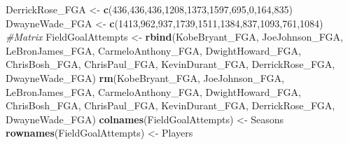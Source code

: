 \documentclass[
]{article}
\newenvironment{Shaded}{\begin{snugshade}}{\end{snugshade}}
\newcommand{\CommentTok}[1]{\textcolor[rgb]{0.56,0.35,0.01}{\textit{#1}}}
\newcommand{\DecValTok}[1]{\textcolor[rgb]{0.00,0.00,0.81}{#1}}
\newcommand{\KeywordTok}[1]{\textcolor[rgb]{0.13,0.29,0.53}{\textbf{#1}}}
\newcommand{\NormalTok}[1]{#1}
\newcommand{\StringTok}[1]{\textcolor[rgb]{0.31,0.60,0.02}{#1}}
\begin{document}
\begin{Shaded}
\begin{Highlighting}[]
\NormalTok{DerrickRose_FGA <-}\StringTok{ }\KeywordTok{c}\NormalTok{(}\DecValTok{436}\NormalTok{,}\DecValTok{436}\NormalTok{,}\DecValTok{436}\NormalTok{,}\DecValTok{1208}\NormalTok{,}\DecValTok{1373}\NormalTok{,}\DecValTok{1597}\NormalTok{,}\DecValTok{695}\NormalTok{,}\DecValTok{0}\NormalTok{,}\DecValTok{164}\NormalTok{,}\DecValTok{835}\NormalTok{)}
\NormalTok{DwayneWade_FGA <-}\StringTok{ }\KeywordTok{c}\NormalTok{(}\DecValTok{1413}\NormalTok{,}\DecValTok{962}\NormalTok{,}\DecValTok{937}\NormalTok{,}\DecValTok{1739}\NormalTok{,}\DecValTok{1511}\NormalTok{,}\DecValTok{1384}\NormalTok{,}\DecValTok{837}\NormalTok{,}\DecValTok{1093}\NormalTok{,}\DecValTok{761}\NormalTok{,}\DecValTok{1084}\NormalTok{)}
\CommentTok{#Matrix}
\NormalTok{FieldGoalAttempts <-}\StringTok{ }\KeywordTok{rbind}\NormalTok{(KobeBryant_FGA, JoeJohnson_FGA, LeBronJames_FGA, CarmeloAnthony_FGA, DwightHoward_FGA, ChrisBosh_FGA, ChrisPaul_FGA, KevinDurant_FGA, DerrickRose_FGA, DwayneWade_FGA)}
\KeywordTok{rm}\NormalTok{(KobeBryant_FGA, JoeJohnson_FGA, LeBronJames_FGA, CarmeloAnthony_FGA, DwightHoward_FGA, ChrisBosh_FGA, ChrisPaul_FGA, KevinDurant_FGA, DerrickRose_FGA, DwayneWade_FGA)}
\KeywordTok{colnames}\NormalTok{(FieldGoalAttempts) <-}\StringTok{ }\NormalTok{Seasons}
\KeywordTok{rownames}\NormalTok{(FieldGoalAttempts) <-}\StringTok{ }\NormalTok{Players}


\end{Highlighting}
\end{Shaded}
\end{document}
